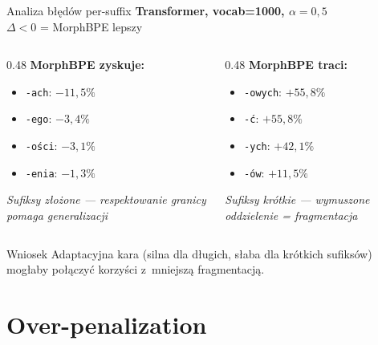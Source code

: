 \documentclass[aspectratio=169,11pt]{beamer}
\begin{document}
\begin{frame}{Analiza błędów per-suffix}
\textbf{Transformer, vocab=1000, $\alpha=0{,}5$} \\
$\Delta < 0$ = MorphBPE lepszy

\bigskip

\begin{columns}[T]
\begin{column}{0.48\textwidth}
\textcolor{slayergreen}{\textbf{MorphBPE zyskuje:}}
\begin{itemize}
  \item \texttt{-ach}: $-11{,}5\%$
  \item \texttt{-ego}: $-3{,}4\%$
  \item \texttt{-ości}: $-3{,}1\%$
  \item \texttt{-enia}: $-1{,}3\%$
\end{itemize}
\smallskip
\textit{Sufiksy złożone --- respektowanie granicy pomaga generalizacji}
\end{column}
\begin{column}{0.48\textwidth}
\textcolor{slayerred}{\textbf{MorphBPE traci:}}
\begin{itemize}
  \item \texttt{-owych}: $+55{,}8\%$
  \item \texttt{-ć}: $+55{,}8\%$
  \item \texttt{-ych}: $+42{,}1\%$
  \item \texttt{-ów}: $+11{,}5\%$
\end{itemize}
\smallskip
\textit{Sufiksy krótkie --- wymuszone oddzielenie = fragmentacja}
\end{column}
\end{columns}

\bigskip
\begin{block}{Wniosek}
Adaptacyjna kara (silna dla długich, słaba dla krótkich sufiksów) mogłaby połączyć korzyści z~mniejszą fragmentacją.
\end{block}
\end{frame}

\section{Over-penalization}
\end{document}

